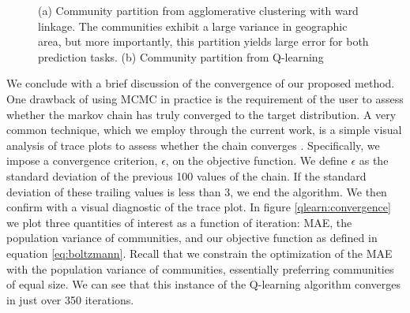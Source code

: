 \begin{figure}[h]
\centering

\caption{(a) Community partition from agglomerative clustering with ward linkage. The communities exhibit a large variance in geographic area, but more importantly, this partition yields large error for both prediction tasks. (b) Community partition from Q-learning}
\label{qlearn:fig}
\end{figure}

We conclude with a brief discussion of the convergence of our proposed method. One drawback of using MCMC in practice is the requirement of the user to assess whether the markov chain has truly converged to the target distribution. A very common technique, which we employ through the current work, is a simple visual analysis of trace plots to assess whether the chain converges \cite{ml:murphy}. Specifically, we impose a convergence criterion, $\epsilon$, on the objective function. We define $\epsilon$ as the standard deviation of the previous 100 values of the chain. If the standard deviation of these trailing values is less than 3, we end the algorithm. We then confirm with a visual diagnostic of the trace plot. In figure \ref{qlearn:convergence} we plot three quantities of interest as a function of iteration: MAE, the population variance of communities, and our objective function as defined in equation \ref{eq:boltzmann}. Recall that we constrain the optimization of the MAE with the population variance of communities, essentially preferring communities of equal size. We can see that this instance of the Q-learning algorithm converges in just over 350 iterations. 


